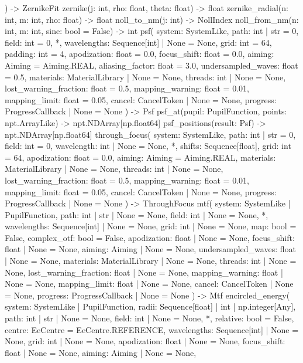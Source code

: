 \documentclass[11pt,a4paper,openany]{book}
\begin{document}
\begin{signatur}
) -> ZernikeFit
zernike(j: int, rho: float, theta: float) -> float
zernike_radial(n: int, m: int, rho: float) -> float
noll_to_nm(j: int) -> NollIndex
noll_from_nm(n: int, m: int, sine: bool = False) -> int
psf(
    system: SystemLike,
    path: int | str = 0,
    field: int = 0,
    *,
    wavelengths: Sequence[int] | None = None,
    grid: int = 64,
    padding: int = 4,
    apodization: float = 0.0,
    focus_shift: float = 0.0,
    aiming: Aiming = Aiming.REAL,
    aliasing_factor: float = 3.0,
    undersampled_waves: float = 0.5,
    materials: MaterialLibrary | None = None,
    threads: int | None = None,
    lost_warning_fraction: float = 0.5,
    mapping_warning: float = 0.01,
    mapping_limit: float = 0.05,
    cancel: CancelToken | None = None,
    progress: ProgressCallback | None = None
) -> Psf
psf_at(pupil: PupilFunction, points: npt.ArrayLike) -> npt.NDArray[np.float64]
psf_positions(result: Psf) -> npt.NDArray[np.float64]
through_focus(
    system: SystemLike,
    path: int | str = 0,
    field: int = 0,
    wavelength: int | None = None,
    *,
    shifts: Sequence[float],
    grid: int = 64,
    apodization: float = 0.0,
    aiming: Aiming = Aiming.REAL,
    materials: MaterialLibrary | None = None,
    threads: int | None = None,
    lost_warning_fraction: float = 0.5,
    mapping_warning: float = 0.01,
    mapping_limit: float = 0.05,
    cancel: CancelToken | None = None,
    progress: ProgressCallback | None = None
) -> ThroughFocus
mtf(
    system: SystemLike | PupilFunction,
    path: int | str | None = None,
    field: int | None = None,
    *,
    wavelengths: Sequence[int] | None = None,
    grid: int | None = None,
    map: bool = False,
    complex_otf: bool = False,
    apodization: float | None = None,
    focus_shift: float | None = None,
    aiming: Aiming | None = None,
    undersampled_waves: float | None = None,
    materials: MaterialLibrary | None = None,
    threads: int | None = None,
    lost_warning_fraction: float | None = None,
    mapping_warning: float | None = None,
    mapping_limit: float | None = None,
    cancel: CancelToken | None = None,
    progress: ProgressCallback | None = None
) -> Mtf
encircled_energy(
    system: SystemLike | PupilFunction,
    radii: Sequence[float] | int | np.integer[Any],
    path: int | str | None = None,
    field: int | None = None,
    *,
    relative: bool = False,
    centre: EeCentre = EeCentre.REFERENCE,
    wavelengths: Sequence[int] | None = None,
    grid: int | None = None,
    apodization: float | None = None,
    focus_shift: float | None = None,
    aiming: Aiming | None = None,

\end{signatur}
\end{document}
